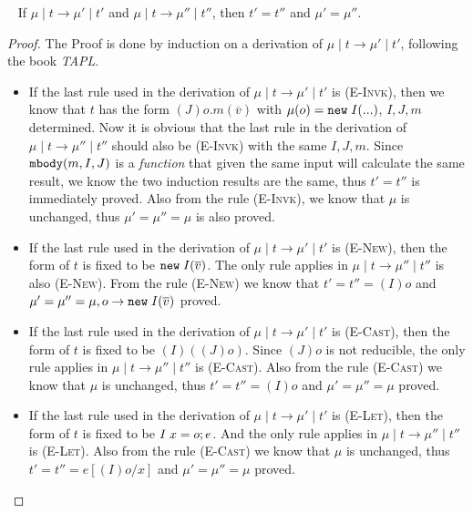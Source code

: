 \begin{theorem}~\label{theorem_determinacy}
	If $\mu \mid t \to \mu' \mid t'$ and $\mu \mid t \to \mu'' \mid t''$, then $t' = t''$ and $\mu' = \mu''$.
\end{theorem}
\begin{proof}	
The Proof is done by induction on a derivation of $\mu \mid t \to \mu' \mid t'$, following the book  \emph{TAPL}.
\begin{itemize}
	\item If the last rule used in the derivation of $\mu \mid t \to \mu' \mid t'$ is \textsc{(E-Invk)}, then we know that $t$ has the form $(J)o.m(\overline{v})$ with $\mu(o) = \texttt{new} \; I(...)$, $I, J, m$ determined. Now it is obvious that the last rule in the derivation of $\mu \mid t \to \mu'' \mid t''$ should also be \textsc{(E-Invk)} with the same $I, J, m$. Since $\texttt{mbody}(m, I, J)$ is a \emph{function} that given the same input will calculate the same result, we know the two induction results are the same, thus $t' = t''$ is immediately proved. Also from the rule \textsc{(E-Invk)}, we know that $\mu$ is unchanged, thus $\mu' = \mu'' = \mu$ is also proved.
	
	\item If the last rule used in the derivation of $\mu \mid t \to \mu' \mid t'$ is \textsc{(E-New)}, then the form of $t$ is fixed to be $\texttt{new} \; I(\overline{v})$. The only rule applies in $\mu \mid t \to \mu'' \mid t''$ is also \textsc{(E-New)}. From the rule \textsc{(E-New)} we know that $t' = t'' = (I)o$ and $\mu' = \mu'' = \mu, o \to \texttt{new} \; I(\overline{v})$ proved.
	
	\item If the last rule used in the derivation of $\mu \mid t \to \mu' \mid t'$ is \textsc{(E-Cast)}, then the form of $t$ is fixed to be $(I)((J)o)$. Since $(J)o$ is not reducible, the only rule applies in $\mu \mid t \to \mu'' \mid t''$ is \textsc{(E-Cast)}. Also from the rule \textsc{(E-Cast)} we know that $\mu$ is unchanged, thus $t' = t'' = (I)o$ and $\mu' = \mu'' = \mu$ proved.
	
	\item If the last rule used in the derivation of $\mu \mid t \to \mu' \mid t'$ is \textsc{(E-Let)}, then the form of $t$ is fixed to be $I \; x = o;e$. And the only rule applies in $\mu \mid t \to \mu'' \mid t''$ is \textsc{(E-Let)}. Also from the rule \textsc{(E-Cast)} we know that $\mu$ is unchanged, thus $t' = t'' = e[(I)o/x]$ and $\mu' = \mu'' = \mu$ proved.
	

\end{itemize}
\end{proof}
